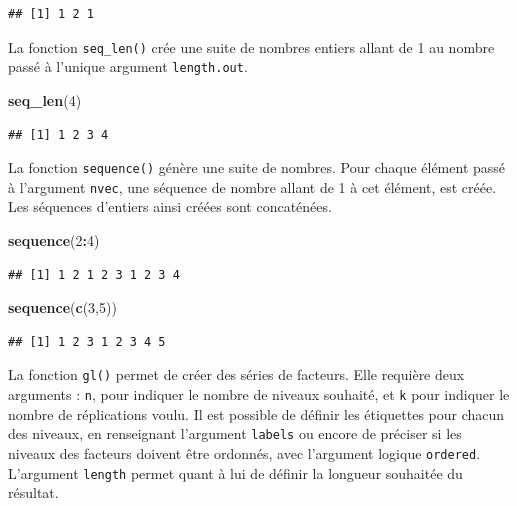 \documentclass[
  11pt,
]{book}
\newenvironment{Shaded}{\begin{snugshade}}{\end{snugshade}}
\newcommand{\DecValTok}[1]{\textcolor[rgb]{0.00,0.00,0.81}{#1}}
\newcommand{\KeywordTok}[1]{\textcolor[rgb]{0.13,0.29,0.53}{\textbf{#1}}}
\newcommand{\NormalTok}[1]{#1}
\newcommand{\OperatorTok}[1]{\textcolor[rgb]{0.81,0.36,0.00}{\textbf{#1}}}
\numberwithin{equation}{section}
\numberwithin{countremarque}{section}
\begin{document}
\begin{lstlisting}
## [1] 1 2 1
\end{lstlisting}

La fonction \texttt{seq\_len()} crée une suite de nombres entiers allant de 1 au nombre passé à l'unique argument \texttt{length.out}.

\begin{Shaded}
\begin{Highlighting}[]
\KeywordTok{seq\_len}\NormalTok{(}\DecValTok{4}\NormalTok{)}
\end{Highlighting}
\end{Shaded}

\begin{lstlisting}
## [1] 1 2 3 4
\end{lstlisting}

La fonction \texttt{sequence()} génère une suite de nombres. Pour chaque élément passé à l'argument \texttt{nvec}, une séquence de nombre allant de 1 à cet élément, est créée. Les séquences d'entiers ainsi créées sont concaténées.

\begin{Shaded}
\begin{Highlighting}[]
\KeywordTok{sequence}\NormalTok{(}\DecValTok{2}\OperatorTok{:}\DecValTok{4}\NormalTok{)}
\end{Highlighting}
\end{Shaded}

\begin{lstlisting}
## [1] 1 2 1 2 3 1 2 3 4
\end{lstlisting}

\begin{Shaded}
\begin{Highlighting}[]
\KeywordTok{sequence}\NormalTok{(}\KeywordTok{c}\NormalTok{(}\DecValTok{3}\NormalTok{,}\DecValTok{5}\NormalTok{))}
\end{Highlighting}
\end{Shaded}

\begin{lstlisting}
## [1] 1 2 3 1 2 3 4 5
\end{lstlisting}

La fonction \texttt{gl()} permet de créer des séries de facteurs. Elle requière deux arguments : \texttt{n}, pour indiquer le nombre de niveaux souhaité, et \texttt{k} pour indiquer le nombre de réplications voulu. Il est possible de définir les étiquettes pour chacun des niveaux, en renseignant l'argument \texttt{labels} ou encore de préciser si les niveaux des facteurs doivent être ordonnés, avec l'argument logique \texttt{ordered}. L'argument \texttt{length} permet quant à lui de définir la longueur souhaitée du résultat.
\end{document}
